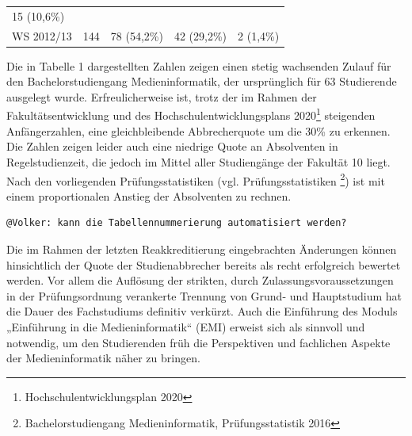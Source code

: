 \begin{longtable}[c]{@{}lllll@{}}
\begin{minipage}[t]{0.19\columnwidth}
15 (10,6\%)
\strut\end{minipage}\tabularnewline
\begin{minipage}[t]{0.13\columnwidth}\raggedright\strut
WS 2012/13
\strut\end{minipage} &
\begin{minipage}[t]{0.27\columnwidth}\raggedright\strut
144
\strut\end{minipage} &
\begin{minipage}[t]{0.26\columnwidth}\raggedright\strut
78 (54,2\%)
\strut\end{minipage} &
\begin{minipage}[t]{0.17\columnwidth}\raggedright\strut
42 (29,2\%)
\strut\end{minipage} &
\begin{minipage}[t]{0.19\columnwidth}\raggedright\strut
2 (1,4\%)
\strut\end{minipage}\tabularnewline
\bottomrule
\end{longtable}

Die in Tabelle 1 dargestellten Zahlen zeigen einen stetig wachsenden
Zulauf für den Bachelorstudiengang Medieninformatik, der ursprünglich
für 63 Studierende ausgelegt wurde. Erfreulicherweise ist, trotz der im
Rahmen der Fakultätsentwicklung und des Hochschulentwicklungsplans
2020\footnote{Hochschulentwicklungsplan 2020} steigenden Anfängerzahlen,
eine gleichbleibende Abbrecherquote um die 30\% zu erkennen. Die Zahlen
zeigen leider auch eine niedrige Quote an Absolventen in
Regelstudienzeit, die jedoch im Mittel aller Studiengänge der Fakultät
10 liegt. Nach den vorliegenden Prüfungsstatistiken (vgl.
Prüfungsstatistiken \footnote{Bachelorstudiengang Medieninformatik,
  Prüfungsstatistik 2016}) ist mit einem proportionalen Anstieg der
Absolventen zu rechnen.

\begin{verbatim}
@Volker: kann die Tabellennummerierung automatisiert werden?
\end{verbatim}

Die im Rahmen der letzten Reakkreditierung eingebrachten Änderungen
können hinsichtlich der Quote der Studienabbrecher bereits als recht
erfolgreich bewertet werden. Vor allem die Auflösung der strikten, durch
Zulassungsvoraussetzungen in der Prüfungsordnung verankerte Trennung von
Grund- und Hauptstudium hat die Dauer des Fachstudiums definitiv
verkürzt. Auch die Einführung des Moduls „Einführung in die
Medieninformatik`` (EMI) erweist sich als sinnvoll und notwendig, um den
Studierenden früh die Perspektiven und fachlichen Aspekte der
Medieninformatik näher zu bringen.

